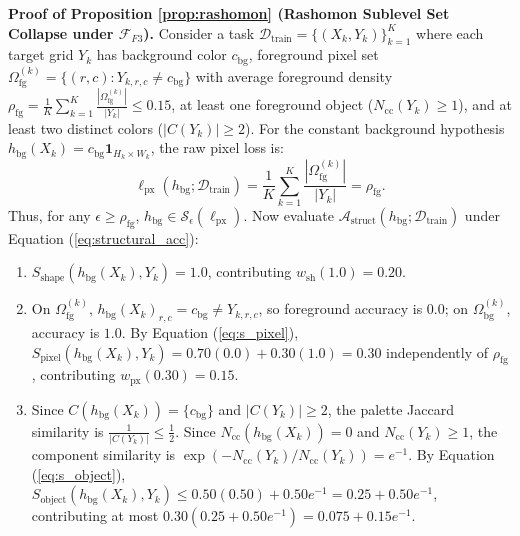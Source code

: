 \documentclass[10pt,a4paper]{article}
\begin{document}
\textbf{Proof of Proposition \ref{prop:rashomon} (Rashomon Sublevel Set Collapse under $\mathcal{F}_{F3}$).}
Consider a task $\mathcal{D}_{\text{train}} = \{(X_k, Y_k)\}_{k=1}^K$ where each target grid $Y_k$ has background color $c_{\text{bg}}$, foreground pixel set $\Omega_{\text{fg}}^{(k)} = \{(r,c) : Y_{k,r,c} \neq c_{\text{bg}}\}$ with average foreground density $\rho_{\text{fg}} = \frac{1}{K}\sum_{k=1}^K \frac{|\Omega_{\text{fg}}^{(k)}|}{|Y_k|} \le 0.15$, at least one foreground object ($N_{\text{cc}}(Y_k) \ge 1$), and at least two distinct colors ($|C(Y_k)| \ge 2$).
For the constant background hypothesis $h_{\text{bg}}(X_k) = c_{\text{bg}}\mathbf{1}_{H_k \times W_k}$, the raw pixel loss is:
\begin{equation}
\ell_{\text{px}}(h_{\text{bg}}; \mathcal{D}_{\text{train}}) = \frac{1}{K}\sum_{k=1}^K \frac{|\Omega_{\text{fg}}^{(k)}|}{|Y_k|} = \rho_{\text{fg}}.
\end{equation}
Thus, for any $\epsilon \ge \rho_{\text{fg}}$, $h_{\text{bg}} \in \mathcal{S}_\epsilon(\ell_{\text{px}})$. Now evaluate $\mathcal{A}_{\text{struct}}(h_{\text{bg}}; \mathcal{D}_{\text{train}})$ under Equation (\ref{eq:structural_acc}):
\begin{enumerate}
    \item $S_{\text{shape}}(h_{\text{bg}}(X_k), Y_k) = 1.0$, contributing $w_{\text{sh}}(1.0) = 0.20$.
    \item On $\Omega_{\text{fg}}^{(k)}$, $h_{\text{bg}}(X_k)_{r,c} = c_{\text{bg}} \neq Y_{k,r,c}$, so foreground accuracy is $0.0$; on $\Omega_{\text{bg}}^{(k)}$, accuracy is $1.0$. By Equation (\ref{eq:s_pixel}), $S_{\text{pixel}}(h_{\text{bg}}(X_k), Y_k) = 0.70(0.0) + 0.30(1.0) = 0.30$ independently of $\rho_{\text{fg}}$, contributing $w_{\text{px}}(0.30) = 0.15$.
    \item Since $C(h_{\text{bg}}(X_k)) = \{c_{\text{bg}}\}$ and $|C(Y_k)| \ge 2$, the palette Jaccard similarity is $\frac{1}{|C(Y_k)|} \le \frac{1}{2}$. Since $N_{\text{cc}}(h_{\text{bg}}(X_k)) = 0$ and $N_{\text{cc}}(Y_k) \ge 1$, the component similarity is $\exp(-N_{\text{cc}}(Y_k)/N_{\text{cc}}(Y_k)) = e^{-1}$. By Equation (\ref{eq:s_object}), $S_{\text{object}}(h_{\text{bg}}(X_k), Y_k) \le 0.50(0.50) + 0.50 e^{-1} = 0.25 + 0.50 e^{-1}$, contributing at most $0.30(0.25 + 0.50 e^{-1}) = 0.075 + 0.15 e^{-1}$.
\end{enumerate}
\end{document}
